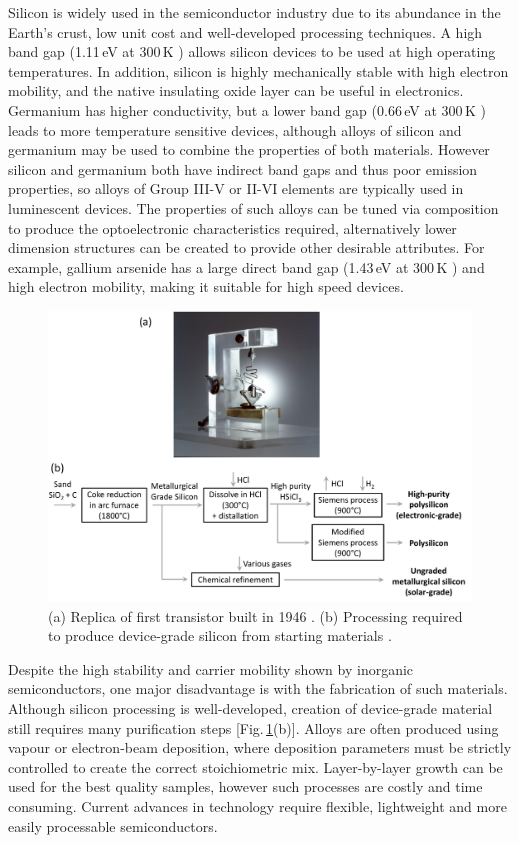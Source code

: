 Silicon is widely used in the semiconductor industry due to its abundance in the Earth's crust, low unit cost and well-developed processing techniques. A high band gap (1.11\,eV at 300\,K \cite{Kittel1986}) %
allows silicon devices %
to be used at high operating temperatures. In addition, silicon is highly mechanically stable with high electron mobility, and the native insulating oxide layer can be useful in electronics. Germanium has higher conductivity, but a lower band gap (0.66\,eV at 300\,K \cite{Kittel1986}) leads to more temperature sensitive devices, although alloys of silicon and germanium may be used to combine the properties of both materials. However silicon and germanium both have indirect band gaps and thus poor emission properties, so alloys of Group III-V or II-VI elements are typically used in luminescent devices. The properties of such alloys can be tuned via composition to produce the optoelectronic characteristics required, alternatively lower dimension structures can be created to provide other desirable attributes. For example, gallium arsenide has a large direct band gap (1.43\,eV at 300\,K \cite{Kittel1986}) and high electron mobility, making it suitable for high speed devices.
\begin{figure}[h!]
\centering
\includegraphics[width=\textwidth]{Fig1}
\caption{(a) Replica of first transistor built in 1946 \cite{Transistor}. (b) Processing required to produce device-grade silicon from starting materials \cite{Silicon}.}
\label{1Fig1}
\end{figure}

Despite the high stability and carrier mobility shown by inorganic semiconductors, one major disadvantage is with the fabrication of such materials. Although silicon processing is well-developed, creation of device-grade material still requires many purification steps [Fig.\,\ref{1Fig1}(b)]. Alloys are often produced using vapour or electron-beam deposition, where deposition parameters must be strictly controlled to create the correct stoichiometric mix. Layer-by-layer growth can be used for the best quality samples, however such processes are costly and time consuming. Current advances in technology require flexible, lightweight and more easily processable semiconductors.

